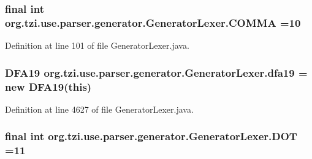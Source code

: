 \hypertarget{classorg_1_1tzi_1_1use_1_1parser_1_1generator_1_1_generator_lexer_aa65242ff4fc46ad6894974b8b9f8b23a}{
\subsubsection[{C\-O\-M\-M\-A}]{\setlength{\rightskip}{0pt plus 5cm}final int org.\-tzi.\-use.\-parser.\-generator.\-Generator\-Lexer.\-C\-O\-M\-M\-A =10\hspace{0.3cm}{\ttfamily [static]}}}\label{classorg_1_1tzi_1_1use_1_1parser_1_1generator_1_1_generator_lexer_aa65242ff4fc46ad6894974b8b9f8b23a}


Definition at line 101 of file Generator\-Lexer.\-java.

\hypertarget{classorg_1_1tzi_1_1use_1_1parser_1_1generator_1_1_generator_lexer_a90e88d1c4c0576cc8767fbf64cee3214}{
\subsubsection[{dfa19}]{\setlength{\rightskip}{0pt plus 5cm}D\-F\-A19 org.\-tzi.\-use.\-parser.\-generator.\-Generator\-Lexer.\-dfa19 = new D\-F\-A19(this)\hspace{0.3cm}{\ttfamily [protected]}}}\label{classorg_1_1tzi_1_1use_1_1parser_1_1generator_1_1_generator_lexer_a90e88d1c4c0576cc8767fbf64cee3214}


Definition at line 4627 of file Generator\-Lexer.\-java.

\hypertarget{classorg_1_1tzi_1_1use_1_1parser_1_1generator_1_1_generator_lexer_ac205610a60c588090b881318c35c5620}{
\subsubsection[{D\-O\-T}]{\setlength{\rightskip}{0pt plus 5cm}final int org.\-tzi.\-use.\-parser.\-generator.\-Generator\-Lexer.\-D\-O\-T =11\hspace{0.3cm}{\ttfamily [static]}}}\label{classorg_1_1tzi_1_1use_1_1parser_1_1generator_1_1_generator_lexer_ac205610a60c588090b881318c35c5620}


